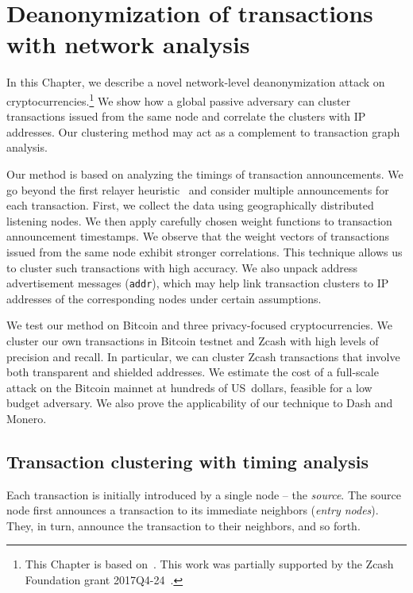 \chapter{Deanonymization of transactions with network analysis} %

\label{Chapter03Clustering}

In this Chapter, we describe a novel network-level deanonymization attack on cryptocurrencies.\footnote{This Chapter is based on~\cite{Biryukov2019a, Biryukov2019b}. This work was partially supported by the Zcash Foundation grant 2017Q4-24~\cite{Feher2017}.}
We show how a global passive adversary can cluster transactions issued from the same node and correlate the clusters with IP addresses.
Our clustering method may act as a complement to transaction graph analysis.

Our method is based on analyzing the timings of transaction announcements.
We go beyond the first relayer heuristic~\cite{Biryukov2014, Koshy2014} and consider multiple announcements for each transaction.
First, we collect the data using geographically distributed listening nodes.
We then apply carefully chosen weight functions to transaction announcement timestamps.
We observe that the weight vectors of transactions issued from the same node exhibit stronger correlations.
This technique allows us to cluster such transactions with high accuracy.
We also unpack address advertisement messages (\texttt{addr}), which may help link transaction clusters to IP addresses of the corresponding nodes under certain assumptions.

We test our method on Bitcoin and three privacy-focused cryptocurrencies.
We cluster our own transactions in Bitcoin testnet and Zcash with high levels of precision and recall.
In particular, we can cluster Zcash transactions that involve both transparent and shielded addresses.
We estimate the cost of a full-scale attack on the Bitcoin mainnet at hundreds of US~dollars, feasible for a low budget adversary.
We also prove the applicability of our technique to Dash and Monero.


\section{Transaction clustering with timing analysis}  \label{sec:Ch03Ourapproach}

Each transaction is initially introduced by a single node -- the \textit{source}.
The source node first announces a transaction to its immediate neighbors (\textit{entry nodes}).
They, in turn, announce the transaction to their neighbors, and so forth.


